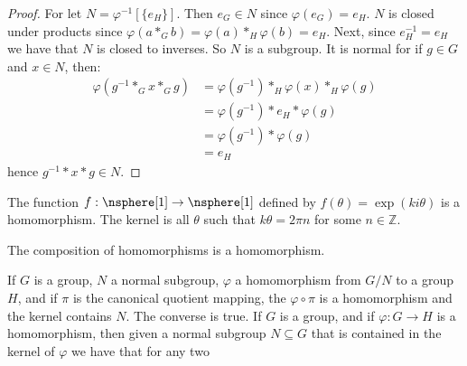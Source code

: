 \documentclass{article}                                                        %
\begin{document}
                \begin{proof}
                    For let $N=\varphi^{\minus{1}}[\{e_{H}\}]$. Then
                    $e_{G}\in{N}$ since $\varphi(e_{G})=e_{H}$. $N$ is closed
                    under products since
                    $\varphi(a*_{G}b)=\varphi(a)*_{H}\varphi(b)=e_{H}$. Next,
                    since $e_{H}^{\minus{1}}=e_{H}$ we have that $N$ is closed
                    to inverses. So $N$ is a subgroup. It is normal for if
                    $g\in{G}$ and $x\in{N}$, then:
                    \begin{subequations}
                        \begin{align}
                            \varphi(g^{\minus{1}}*_{G}x*_{G}g)
                            &=\varphi(g^{\minus{1}})*_{H}
                                \varphi(x)*_{H}\varphi(g)\\
                            &=\varphi(g^{\minus{1}})*e_{H}*\varphi(g)\\
                            &=\varphi(g^{\minus{1}})*\varphi(g)\\
                            &=e_{H}
                        \end{align}
                    \end{subequations}
                    hence $g^{\minus{1}}*x*g\in{N}$.
                \end{proof}
                \begin{example}
                    The function $f:\nsphere[1]\rightarrow\nsphere[1]$ defined
                    by $f(\theta)=\exp(ki\theta)$ is a homomorphism. The
                    kernel is all $\theta$ such that $k\theta=2\pi{n}$ for some
                    $n\in\mathbb{Z}$.
                \end{example}
                \begin{theorem}
                    The composition of homomorphisms is a homomorphism.
                \end{theorem}
                If $G$ is a group, $N$ a normal subgroup, $\varphi$ a
                homomorphism from $G/N$ to a group $H$, and if $\pi$ is the
                canonical quotient mapping, the $\varphi\circ\pi$ is a
                homomorphism and the kernel contains $N$. The converse is true.
                If $G$ is a group, and if $\varphi:G\rightarrow{H}$ is a
                homomorphism, then given a normal subgroup $N\subseteq{G}$ that
                is contained in the kernel of $\varphi$ we have that for any two
\end{document}
